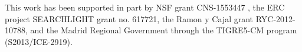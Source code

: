 This work has been supported in part by  NSF grant CNS-1553447 , the ERC project
SEARCHLIGHT grant no. 617721, the Ramon y Cajal grant
RYC-2012-10788, and the Madrid Regional Government through
the TIGRE5-CM program (S2013/ICE-2919).
